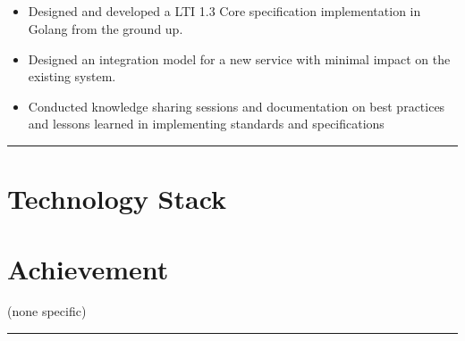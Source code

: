 \documentclass[12pt]{res}
\begin{document}
\begin{resume}
\begin{multicols}{2}
	\section{}
		\begin{itemize}
			\setlength{\itemindent}{0pt}
			\item Designed and developed a LTI 1.3 Core specification implementation in Golang from the ground up.
\item Designed an integration model for a new service with minimal impact on the existing system.
\item Conducted knowledge sharing sessions and documentation on best practices and lessons learned in implementing standards and specifications
		\end{itemize}
\end{multicols}

\vspace{-20pt}
\begin{minipage}[t]{0.55\linewidth}
	\rule{0.25\textwidth}{2pt}
	\begin{multicols}{2}
		\section{Technology Stack}
		\columnbreak
		\section{}
	\end{multicols}
	\vspace{1pt}
\end{minipage}
\hfill
\begin{minipage}[t]{0.42\linewidth}
	\vspace{18pt}
	\section{Achievement}
	\begin{flushleft}
        \footnotesize{\vspace{2.6pt}
(none specific)}
	\end{flushleft}
\end{minipage}

\vspace{10pt}
\rule{1.0\textwidth}{0.1pt}


\end{resume}
\end{document}
